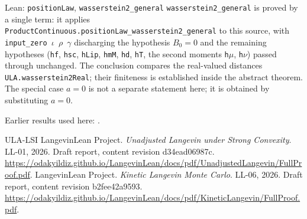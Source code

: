 \documentclass[11pt,a4paper]{article}
\begin{document}
\begin{leanbox}{Lean: \texttt{positionLaw}, \texttt{wasserstein2\_\allowbreak{}general}}
\texttt{wasserstein2\_\allowbreak{}general} is proved by a single term: it applies \texttt{Product\allowbreak{}Continuous.\allowbreak{}position\allowbreak{}Law\_\allowbreak{}wasserstein2\_\allowbreak{}general} to this source, with \texttt{input\_\allowbreak{}zero \ensuremath{\iota} \ensuremath{\rho} \ensuremath{\gamma}} discharging the hypothesis \(B_0=0\) and the remaining hypotheses (\texttt{hf}, \texttt{hsc}, \texttt{h\allowbreak{}Lip}, \texttt{hm\allowbreak{}M}, \texttt{hd}, \texttt{h\allowbreak{}T}, the second moments \texttt{h\ensuremath{\mu}}, \texttt{h\ensuremath{\nu}}) passed through unchanged. The conclusion compares the real-valued distances \texttt{ULA.\allowbreak{}wasserstein2\allowbreak{}Real}; their finiteness is established inside the abstract theorem. The special case \(a=0\) is not a separate statement here; it is obtained by substituting \(a=0\).
\end{leanbox}


Earlier results used here: \cite[Section~3.17.4]{LangevinLean2026ULASC}.

\begin{thebibliography}{ULA-LSI}
LangevinLean Project. \emph{Unadjusted Langevin under Strong Convexity}. LL-01, 2026. Draft report, content revision d34ead06987c. \url{https://odakyildiz.github.io/LangevinLean/docs/pdf/UnadjustedLangevin/FullProof.pdf}.
LangevinLean Project. \emph{Kinetic Langevin Monte Carlo}. LL-06, 2026. Draft report, content revision b2fee42a9593. \url{https://odakyildiz.github.io/LangevinLean/docs/pdf/KineticLangevin/FullProof.pdf}.
\end{thebibliography}
\end{document}

